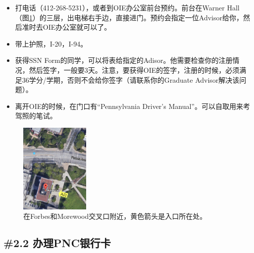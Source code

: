 \documentclass[letterpaper,10pt]{article}
\begin{document}
	\begin{itemize}
		\item 打电话（412-268-5231），或者到OIE办公室前台预约。前台在Warner Hall（图\ref{fig:warner}）的三层，出电梯右手边，直接进门。预约会指定一位Advisor给你，然后准时去OIE办公室就可以了。
		\item 带上护照，I-20，I-94。
		\item 获得SSN Form的同学，可以将表给指定的Adisor。他需要检查你的注册情况，然后签字，一般要3天。注意，要获得OIE的签字，注册的时候，必须满足36学分/学期，否则不会给你签字（请联系你的Graduate Advisor解决该问题）。
		\item 离开OIE的时候，在门口有“Pennsylvania Driver's Manual”。可以自取用来考驾照的笔试。
	\end{itemize}
	
	\begin{figure}[!h]
		\centering
		\includegraphics[width=0.3\textwidth]{./img/warner}
		\caption{在Forbes和Morewood交叉口附近，黄色箭头是入口所在处。}
		\label{fig:warner}
	\end{figure}
	
	\subsection*{\#2.2 办理PNC银行卡}
	
\end{document}
